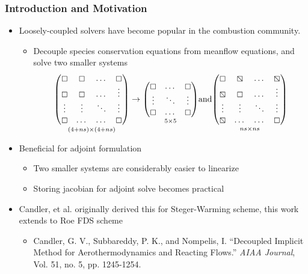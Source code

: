 \documentclass{beamer}
\begin{document}
\begin{frame}
  \frametitle{Introduction and Motivation}
  \begin{itemize}
    \item Loosely-coupled solvers have become popular in the combustion
      community.
      \begin{itemize}
        \item Decouple species conservation equations from meanflow equations,
          and solve two smaller systems
         \[
           \underset{(4+ns) \times (4+ns)}
           {\begin{pmatrix}
             \boxempty & \boxempty & \dots  & \boxempty \\
             \boxempty & \boxempty & \dots  & \vdots \\
             \vdots    & \vdots    & \ddots & \vdots \\
             \boxempty & \dots     & \dots  & \boxempty
           \end{pmatrix}}
           \to
           \underset{5 \times 5}
           {\begin{pmatrix}
             \boxempty & \dots  & \boxempty \\
             \vdots    & \ddots & \vdots \\
             \boxempty & \dots  & \boxempty
           \end{pmatrix}}
           \text{and}
           \underset{ns \times ns}
           {\begin{pmatrix}
             \boxempty  & \boxbslash & \dots  & \boxbslash \\
             \boxbslash & \boxempty  & \dots  & \vdots \\
             \vdots     & \vdots     & \ddots & \vdots \\
             \boxbslash & \dots      & \dots  & \boxempty
           \end{pmatrix}}
         \]
    \end{itemize}
    \item Beneficial for adjoint formulation
    \begin{itemize}
      \item Two smaller systems are considerably easier to linearize
      \item Storing jacobian for adjoint solve becomes practical
    \end{itemize}
      \item Candler, et al. originally derived this for Steger-Warming scheme, this
        work extends to Roe FDS scheme
      \begin{itemize}
        \item Candler, G. V., Subbareddy, P. K., and Nompelis, I. ``Decoupled
          Implicit Method for Aerothermodynamics and Reacting Flows.'' \textit{AIAA
          Journal}, Vol. 51, no. 5, pp. 1245-1254.
      \end{itemize}
  \end{itemize}
\end{frame}
\end{document}
